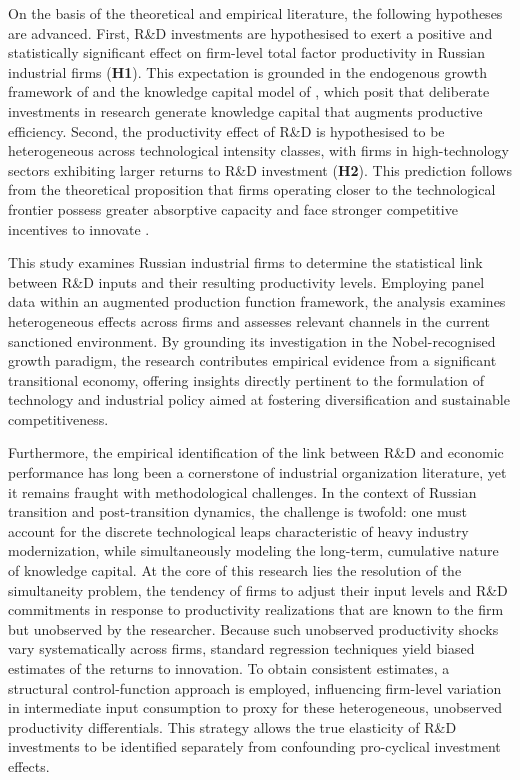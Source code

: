 \documentclass[a4paper, 12pt]{article}
\begin{document}
On the basis of the theoretical and empirical literature, the following hypotheses are advanced. First, R\&D investments are hypothesised to exert a positive and statistically significant effect on firm-level total factor productivity in Russian industrial firms (\textbf{H1}). This expectation is grounded in the endogenous growth framework of \textcite{romer1990endogenous} and the knowledge capital model of \textcite{griliches1979issues}, which posit that deliberate investments in research generate knowledge capital that augments productive efficiency. Second, the productivity effect of R\&D is hypothesised to be heterogeneous across technological intensity classes, with firms in high-technology sectors exhibiting larger returns to R\&D investment (\textbf{H2}). This prediction follows from the theoretical proposition that firms operating closer to the technological frontier possess greater absorptive capacity and face stronger competitive incentives to innovate \parencite{aghion1990model}.

This study examines Russian industrial firms to determine the statistical link between R\&D inputs and their resulting productivity levels. Employing panel data within an augmented production function framework, the analysis examines heterogeneous effects across firms and assesses relevant channels in the current sanctioned environment. By grounding its investigation in the Nobel-recognised growth paradigm, the research contributes empirical evidence from a significant transitional economy, offering insights directly pertinent to the formulation of technology and industrial policy aimed at fostering diversification and sustainable competitiveness.

Furthermore, the empirical identification of the link between R\&D and economic performance has long been a cornerstone of industrial organization literature, yet it remains fraught with methodological challenges. In the context of Russian transition and post-transition dynamics, the challenge is twofold: one must account for the discrete technological leaps characteristic of heavy industry modernization, while simultaneously modeling the long-term, cumulative nature of knowledge capital. At the core of this research lies the resolution of the simultaneity problem, the tendency of firms to adjust their input levels and R\&D commitments in response to productivity realizations that are known to the firm but unobserved by the researcher. Because such unobserved productivity shocks vary systematically across firms, standard regression techniques yield biased estimates of the returns to innovation. To obtain consistent estimates, a structural control-function approach is employed, influencing firm-level variation in intermediate input consumption to proxy for these heterogeneous, unobserved productivity differentials. This strategy allows the true elasticity of R\&D investments to be identified separately from confounding pro-cyclical investment effects.
\end{document}
